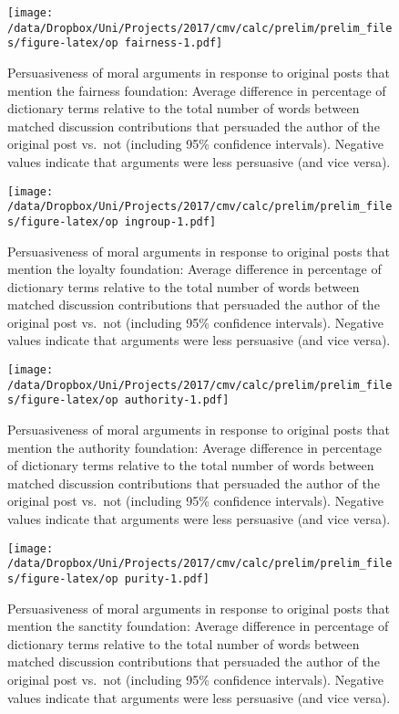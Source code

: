 \begin{figure}
\centering
\texttt{[image: /data/Dropbox/Uni/Projects/2017/cmv/calc/prelim/prelim\_files/figure-latex/op fairness-1.pdf]}
\caption{Persuasiveness of moral arguments in response to original posts
that mention the fairness foundation: Average difference in percentage
of dictionary terms relative to the total number of words between
matched discussion contributions that persuaded the author of the
original post vs.~not (including 95\% confidence intervals). Negative
values indicate that arguments were less persuasive (and vice versa).}
\end{figure}

\begin{figure}
\centering
\texttt{[image: /data/Dropbox/Uni/Projects/2017/cmv/calc/prelim/prelim\_files/figure-latex/op ingroup-1.pdf]}
\caption{Persuasiveness of moral arguments in response to original posts
that mention the loyalty foundation: Average difference in percentage of
dictionary terms relative to the total number of words between matched
discussion contributions that persuaded the author of the original post
vs.~not (including 95\% confidence intervals). Negative values indicate
that arguments were less persuasive (and vice versa).}
\end{figure}

\begin{figure}
\centering
\texttt{[image: /data/Dropbox/Uni/Projects/2017/cmv/calc/prelim/prelim\_files/figure-latex/op authority-1.pdf]}
\caption{Persuasiveness of moral arguments in response to original posts
that mention the authority foundation: Average difference in percentage
of dictionary terms relative to the total number of words between
matched discussion contributions that persuaded the author of the
original post vs.~not (including 95\% confidence intervals). Negative
values indicate that arguments were less persuasive (and vice versa).}
\end{figure}

\begin{figure}
\centering
\texttt{[image: /data/Dropbox/Uni/Projects/2017/cmv/calc/prelim/prelim\_files/figure-latex/op purity-1.pdf]}
\caption{Persuasiveness of moral arguments in response to original posts
that mention the sanctity foundation: Average difference in percentage
of dictionary terms relative to the total number of words between
matched discussion contributions that persuaded the author of the
original post vs.~not (including 95\% confidence intervals). Negative
values indicate that arguments were less persuasive (and vice versa).}
\end{figure}

